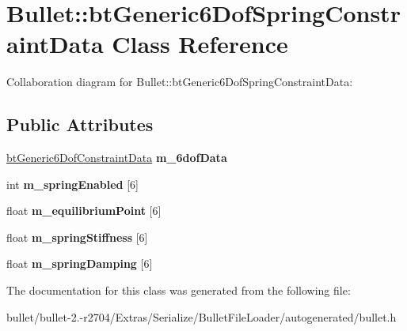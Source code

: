 \hypertarget{class_bullet_1_1bt_generic6_dof_spring_constraint_data}{\section{Bullet\+:\+:bt\+Generic6\+Dof\+Spring\+Constraint\+Data Class Reference}
\label{class_bullet_1_1bt_generic6_dof_spring_constraint_data}
}


Collaboration diagram for Bullet\+:\+:bt\+Generic6\+Dof\+Spring\+Constraint\+Data\+:
\subsection*{Public Attributes}
\begin{DoxyCompactItemize}
\item 
\hypertarget{class_bullet_1_1bt_generic6_dof_spring_constraint_data_a17c02a52508848321385ad6ce1eed77f}{\hyperlink{class_bullet_1_1bt_generic6_dof_constraint_data}{bt\+Generic6\+Dof\+Constraint\+Data} {\bfseries m\+\_\+6dof\+Data}}\label{class_bullet_1_1bt_generic6_dof_spring_constraint_data_a17c02a52508848321385ad6ce1eed77f}

\item 
\hypertarget{class_bullet_1_1bt_generic6_dof_spring_constraint_data_aad76c77a05b3b2ddb460af6404265f69}{int {\bfseries m\+\_\+spring\+Enabled} \mbox{[}6\mbox{]}}\label{class_bullet_1_1bt_generic6_dof_spring_constraint_data_aad76c77a05b3b2ddb460af6404265f69}

\item 
\hypertarget{class_bullet_1_1bt_generic6_dof_spring_constraint_data_ae3f87efdad268288b682cc15b45639be}{float {\bfseries m\+\_\+equilibrium\+Point} \mbox{[}6\mbox{]}}\label{class_bullet_1_1bt_generic6_dof_spring_constraint_data_ae3f87efdad268288b682cc15b45639be}

\item 
\hypertarget{class_bullet_1_1bt_generic6_dof_spring_constraint_data_a506c09503811197836249104862cc8a8}{float {\bfseries m\+\_\+spring\+Stiffness} \mbox{[}6\mbox{]}}\label{class_bullet_1_1bt_generic6_dof_spring_constraint_data_a506c09503811197836249104862cc8a8}

\item 
\hypertarget{class_bullet_1_1bt_generic6_dof_spring_constraint_data_a5a50053f7e3a24d4661df268472cffe2}{float {\bfseries m\+\_\+spring\+Damping} \mbox{[}6\mbox{]}}\label{class_bullet_1_1bt_generic6_dof_spring_constraint_data_a5a50053f7e3a24d4661df268472cffe2}

\end{DoxyCompactItemize}


The documentation for this class was generated from the following file\+:\begin{DoxyCompactItemize}
\item 
bullet/bullet-\/2.-\/r2704/\+Extras/\+Serialize/\+Bullet\+File\+Loader/autogenerated/bullet.\+h\end{DoxyCompactItemize}
